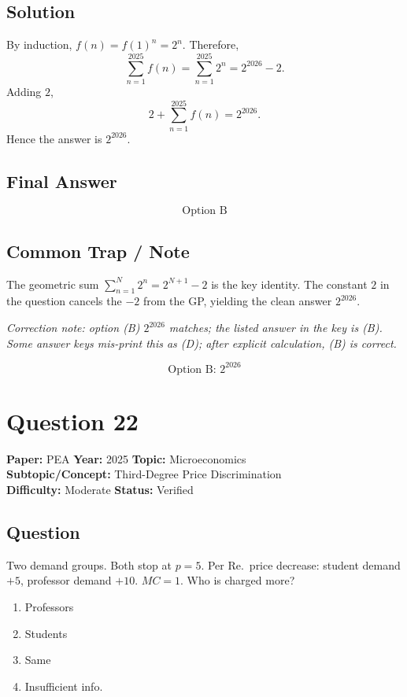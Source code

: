 \documentclass[11pt]{article}
\begin{document}
\subsection*{Solution}
By induction, $f(n) = f(1)^n = 2^n$. Therefore,
\[
\sum_{n=1}^{2025} f(n) = \sum_{n=1}^{2025} 2^n = 2^{2026} - 2.
\]
Adding $2$,
\[
2 + \sum_{n=1}^{2025} f(n) = 2^{2026}.
\]
Hence the answer is $2^{2026}$.

\subsection*{Final Answer}
\[
\boxed{\text{Option B}}
\]
\subsection*{Common Trap / Note}
The geometric sum $\sum_{n=1}^{N} 2^n = 2^{N+1} - 2$ is the key identity. The constant $2$ in the question cancels the $-2$ from the GP, yielding the clean answer $2^{2026}$.

\textit{Correction note: option (B) $2^{2026}$ matches; the listed answer in the key is (B). Some answer keys mis-print this as (D); after explicit calculation, (B) is correct.}

\[
\boxed{\text{Option B: } 2^{2026}}
\]

\section*{Question 22}
\textbf{Paper:} PEA \quad \textbf{Year:} 2025 \quad \textbf{Topic:} Microeconomics \\
\textbf{Subtopic/Concept:} Third-Degree Price Discrimination \\
\textbf{Difficulty:} Moderate \quad \textbf{Status:} Verified

\subsection*{Question}
Two demand groups. Both stop at $p = 5$. Per Re.\ price decrease: student demand $+5$, professor demand $+10$. $MC = 1$. Who is charged more?

\begin{enumerate}[label=(\Alph*)]
\item Professors \item Students \item Same \item Insufficient info.
\end{enumerate}
\end{document}
